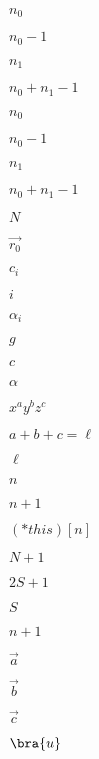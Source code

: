 \documentclass{article}
\begin{document}
$n_0$
\pagebreak

$n_0 -1$
\pagebreak

$n_1$
\pagebreak

$n_0 + n_1 - 1$
\pagebreak

$n_{0}$
\pagebreak

$n_{0} -1$
\pagebreak

$n_{1}$
\pagebreak

$n_0 + n_1 -1$
\pagebreak

$N$
\pagebreak

$\vec{r_0}$
\pagebreak

$c_i$
\pagebreak

$i$
\pagebreak

$\alpha_i$
\pagebreak

$g$
\pagebreak

$c$
\pagebreak

$\alpha$
\pagebreak

$x^ay^bz^c$
\pagebreak

$a+b+c = \ell$
\pagebreak

$\ell$
\pagebreak

$n$
\pagebreak

$n + 1$
\pagebreak

$(*this)[n]$
\pagebreak

$N+1$
\pagebreak

$2S+1$
\pagebreak

$S$
\pagebreak

$n + 1 $
\pagebreak

$\vec{a}$
\pagebreak

$\vec{b}$
\pagebreak

$\vec{c}$
\pagebreak

$\bra{u}$
\pagebreak
\end{document}

